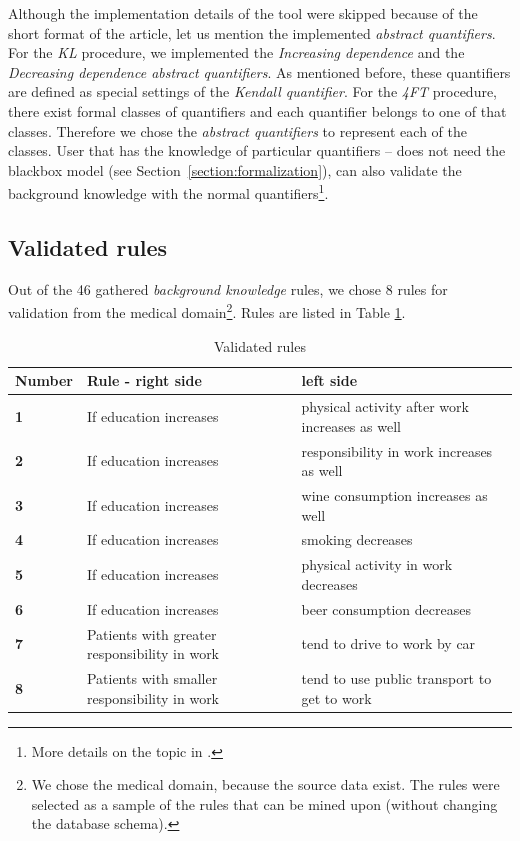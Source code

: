 \documentclass{llncs}
\begin{document}
Although the implementation details of the tool were skipped because of the short 
format of the article, let us mention the implemented \emph{abstract quantifiers}.
For the \emph{KL} procedure, we implemented the \emph{Increasing dependence} and
the \emph{Decreasing dependence abstract quantifiers}. As mentioned before, 
these quantifiers are defined as special settings of the \emph{Kendall quantifier}.
For the \emph{4FT} procedure, there exist formal classes of quantifiers and each
quantifier belongs to one of that classes\cite{Classes}. Therefore we chose the
\emph{abstract quantifiers} to represent each of the classes. User that has the
knowledge of particular quantifiers -- does not need the blackbox model (see 
Section~\ref{section:formalization}), can also validate the background knowledge
with the normal quantifiers\footnote{More details on the topic in 
\cite{Diplomka}.}.

\subsection{Validated rules}
Out of the 46 gathered \emph{background knowledge} rules, we chose 8 rules for
validation from the medical domain\footnote{We chose the medical domain, because
the source data exist. The rules were selected as a sample of the rules that can
be mined upon (without changing the database schema).}. Rules are listed in Table
 \ref{tab:rules}. 

\begin{table}[ht]
	\begin{tabular}{|p{}|p{5cm}|p{5cm}|}
		\hline
			\textbf{Number} & \textbf{Rule - right side} & \textbf{left side}\\
		\hline
			\textbf{1} & If education increases & physical activity after work increases as well\\
		\hline
			\textbf{2} & If education increases & responsibility in work increases as well\\
		\hline
			\textbf{3} & If education increases & wine consumption increases as well\\
		\hline
			\textbf{4} & If education increases & smoking decreases\\
		\hline
			\textbf{5} & If education increases & physical activity in work decreases\\
		\hline
			\textbf{6} & If education increases & beer consumption decreases\\
		\hline
			\textbf{7} & Patients with greater responsibility in work & tend to drive to work by car\\
		\hline
			\textbf{8} & Patients with smaller responsibility in work & tend to use public transport to
			get to work\\
		\hline
	\end{tabular}
	\caption{Validated rules}
\label{tab:rules}
\end{table}
\end{document}

